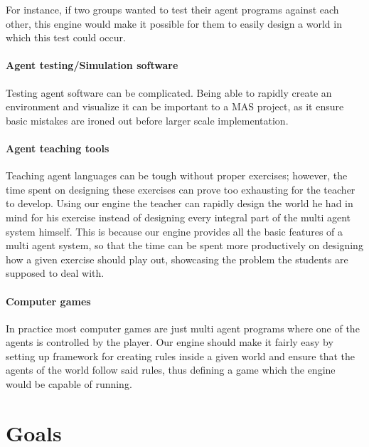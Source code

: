 For instance, if two groups wanted to test their agent programs against
each other, this engine would make it possible for them to easily
design a world in which this test could occur.


\paragraph*{Agent testing/Simulation software}

Testing agent software can be complicated. Being able to rapidly create
an environment and visualize it can be important to a MAS project,
as it ensure basic mistakes are ironed out before larger scale implementation. 


\paragraph*{Agent teaching tools}

Teaching agent languages can be tough without proper exercises; however,
the time spent on designing these exercises can prove too exhausting
for the teacher to develop. Using our engine the teacher can rapidly
design the world he had in mind for his exercise instead of designing
every integral part of the multi agent system himself. This is because
our engine provides all the basic features of a multi agent system,
so that the time can be spent more productively on designing how a
given exercise should play out, showcasing the problem the students
are supposed to deal with.


\paragraph*{Computer games}

In practice most computer games are just multi agent programs where
one of the agents is controlled by the player. Our engine should make
it fairly easy by setting up framework for creating rules inside a
given world and ensure that the agents of the world follow said rules,
thus defining a game which the engine would be capable of running.


\section*{Goals}

